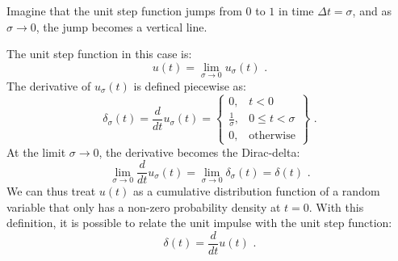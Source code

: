  \begin{marginfigure}
    \begin{center}
    \end{center}
    \caption{Imagine that the unit step function jumps from $0$ to $1$ in time $\Delta t = \sigma$, 
    and as $\sigma \rightarrow 0$, the jump becomes a vertical line.}
  \end{marginfigure}
  The unit step function in this case is:
  \begin{equation}
    u(t) = \lim_{\sigma \rightarrow 0}  u_{\sigma}(t) \,\,.
  \end{equation}
  The derivative of $u_{\sigma}(t)$ is defined piecewise as:
  \begin{equation}
    \delta_{\sigma}(t) = \frac{d}{dt}u_{\sigma}(t) =\left\{
    \begin{array}{cl}
      0,                & t<0                \\
      \frac{1}{\sigma}, & 0\le t < \sigma    \\
      0,                & \mathrm{otherwise}
    \end{array}
    \right\} \,\,.
  \end{equation}
  At the limit $\sigma\rightarrow 0$, the derivative becomes the Dirac-delta:
  \begin{equation}
    \lim_{\sigma \rightarrow 0 } \frac{d}{dt}u_{\sigma}(t) = \lim_{\sigma \rightarrow 0 }\delta_{\sigma}(t) = \delta(t) \,\,.
  \end{equation}
  We can thus treat $u(t)$ as a cumulative distribution function of a
  random variable that only has a non-zero probability density at
  $t=0$. With this definition, it is possible to relate the unit impulse
  with the unit step function:
  \begin{equation}
    \boxed{
      \delta(t) = \frac{d}{dt}u(t)
    } \,\,.
  \end{equation}
\fi

